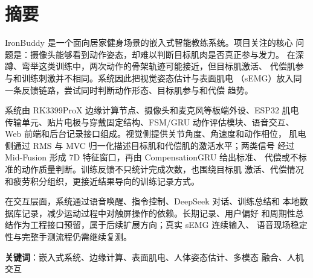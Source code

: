\section*{摘要}

IronBuddy 是一个面向居家健身场景的嵌入式智能教练系统。项目关注的核心
问题是：摄像头能够看到动作姿态，却难以判断目标肌肉是否真正参与发力。
在深蹲、弯举这类训练中，两次动作的骨架轨迹可能接近，但目标肌激活、
代偿肌参与和训练刺激并不相同。系统因此把视觉姿态估计与表面肌电
（sEMG）放入同一条反馈链路，尝试同时判断动作形态、目标肌参与和代偿
趋势。

系统由 RK3399ProX 边缘计算节点、摄像头和麦克风等板端外设、ESP32 肌电
传输单元、贴片电极与穿戴固定结构、FSM/GRU 动作评估模块、语音交互、
Web 前端和后台记录接口组成。视觉侧提供关节角度、角速度和动作相位，
肌电侧通过 RMS 与 MVC 归一化描述目标肌和代偿肌的激活水平；两类信号
经过 Mid-Fusion 形成 7D 特征窗口，再由 CompensationGRU 给出标准、
代偿或不标准的动作质量判断。训练反馈不只统计完成次数，也围绕目标肌
激活、代偿情况和疲劳积分组织，更接近结果导向的训练记录方式。

在交互层面，系统通过语音唤醒、指令控制、DeepSeek 对话、训练总结和
本地数据库记录，减少运动过程中对触屏操作的依赖。长期记录、用户偏好
和周期性总结作为工程接口预留，属于后续扩展方向；真实 sEMG 连续输入、
语音现场稳定性与完整手测流程仍需继续复测。

\textbf{关键词}：嵌入式系统、边缘计算、表面肌电、人体姿态估计、多模态
融合、人机交互

\newpage
